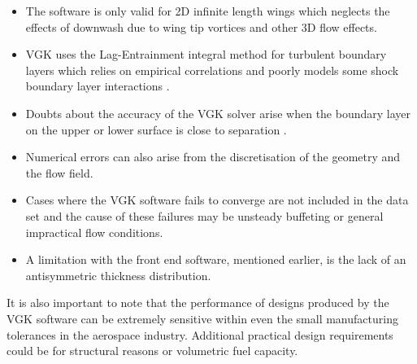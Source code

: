 \documentclass{article}
\begin{document}
\begin{itemize}
    \item  The software is only valid for 2D infinite length wings which neglects the effects of downwash due to wing tip vortices and other 3D flow effects.
    \item  VGK uses the Lag-Entrainment integral method for turbulent boundary layers which relies on empirical correlations
and poorly models some shock boundary layer interactions \cite{lagentrainment}.
    \item  Doubts about the accuracy of the VGK solver arise when the boundary layer on the upper or lower surface is close to separation \cite{esdu}.
    \item  Numerical errors can also arise from the discretisation of the geometry and the flow field.
    \item Cases where the VGK software fails to converge are not included in the data set and the cause of these failures may be unsteady buffeting or general impractical flow conditions.
    \item A limitation with the front end software, mentioned earlier, is the lack of an antisymmetric thickness distribution.
\end{itemize}

It is also important to note that the performance of designs produced by the VGK software can be extremely sensitive
within even the small manufacturing tolerances in the aerospace industry.
Additional practical design requirements could be for structural reasons or volumetric fuel capacity.

\end{document}
